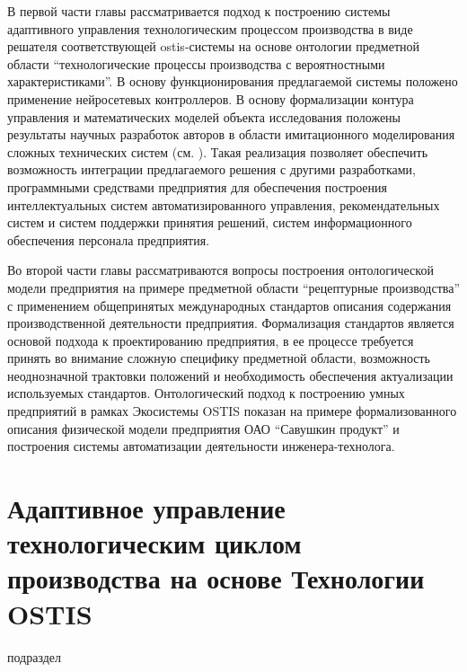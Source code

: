 В первой части главы рассматривается подход к построению системы адаптивного управления технологическим процессом производства в виде решателя соответствующей ostis-системы на основе онтологии предметной области ``технологические процессы производства с вероятностными характеристиками''. В основу функционирования предлагаемой системы положено применение нейросетевых контроллеров. В основу формализации контура управления и математических моделей объекта исследования положены результаты научных разработок авторов в области имитационного моделирования сложных технических систем (см. ). Такая реализация позволяет обеспечить возможность интеграции предлагаемого решения с другими разработками, программными средствами предприятия для обеспечения построения интеллектуальных систем автоматизированного управления, рекомендательных систем и систем поддержки принятия решений, систем информационного обеспечения персонала предприятия.

Во второй части главы рассматриваются вопросы построения онтологической модели предприятия на примере предметной области ``рецептурные производства'' с применением общепринятых международных стандартов описания содержания производственной деятельности предприятия. Формализация стандартов является основой подхода к проектированию предприятия, в ее процессе требуется принять во внимание сложную специфику предметной области, возможность неоднозначной трактовки положений и необходимость обеспечения актуализации используемых стандартов. Онтологический подход к построению умных предприятий в рамках Экосистемы OSTIS показан на примере формализованного описания физической модели предприятия ОАО ``Савушкин продукт'' и построения системы автоматизации деятельности инженера-технолога.

\section{Адаптивное управление технологическим циклом производства на основе Технологии OSTIS}
\label{sec_chapter_enterprise_adaptive_control}


\begin{SCn}

\begin{scnrelfromlist}{подраздел}
\end{scnrelfromlist}

\end{SCn}


